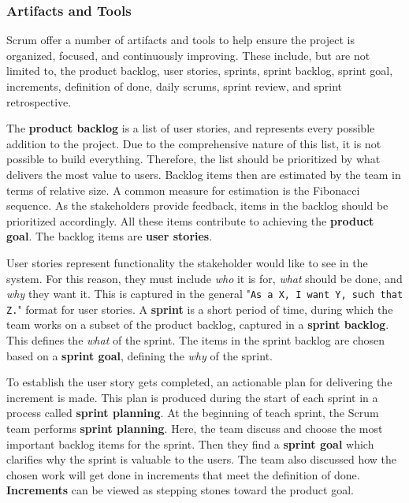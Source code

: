 \subsubsection*{Artifacts and Tools}
Scrum offer a number of artifacts and tools to help ensure the project is organized, focused, and continuously improving. These include, but are not limited to, the product backlog, user stories, sprints, sprint backlog, sprint goal, increments, definition of done, daily scrums, sprint review, and sprint retrospective.\cite{sutherlandScrumArtDoing2014}

The \textbf{product backlog} is a list of user stories, and represents every possible addition to the project.
Due to the comprehensive nature of this list, it is not possible to build everything.
Therefore, the list should be prioritized by what delivers the most value to users.
Backlog items then are estimated by the team in terms of relative size.
A common measure for estimation is the Fibonacci sequence.
As the stakeholders provide feedback, items in the backlog should be prioritized accordingly.
All these items contribute to achieving the \textbf{product goal}.
The backlog items are \textbf{user stories}.

User stories represent functionality the stakeholder would like to see in the system.
For this reason, they must include \textit{who} it is for, \textit{what} should be done, and \textit{why} they want it.
This is captured in the general "\texttt{As a X, I want Y, such that Z.}" format for user stories.
A \textbf{sprint} is a short period of time, during which the team works on a subset of the product backlog, captured in a \textbf{sprint backlog}.
This defines the \textit{what} of the sprint.
The items in the sprint backlog are chosen based on a \textbf{sprint goal}, defining the \textit{why} of the sprint.


To establish  the user story gets completed, an actionable plan for delivering the increment is made. This plan is produced during the start of each sprint in a process called \textbf{sprint planning}.
At the beginning of teach sprint, the Scrum team performs \textbf{sprint planning}.
Here, the team discuss and choose the most important backlog items for the sprint.
Then they find a \textbf{sprint goal} which clarifies why the sprint is valuable to the users.
The team also discussed how the chosen work will get done in increments that meet the definition of done.
\textbf{Increments} can be viewed as stepping stones toward the product goal.

